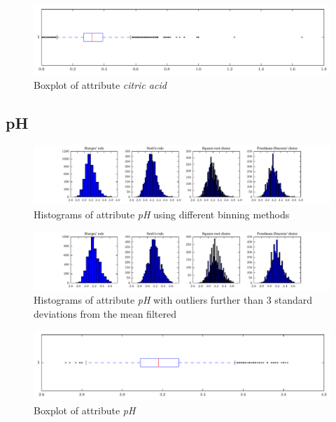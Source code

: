 \documentclass{report}
\begin{document}
\begin{figure}[H]
\includegraphics[width=\textwidth]{boxplots/citric_acid.pdf}
\caption{Boxplot of attribute \emph{citric acid}}\end{figure}

\newpage\subsection{pH}
\begin{figure}[H]
\includegraphics[width=\textwidth]{histograms/pH.pdf}
\caption{Histograms of attribute \emph{pH} using different binning methods}\end{figure}

\begin{figure}[H]
\includegraphics[width=\textwidth]{histograms/pH_filtered.pdf}
\caption{Histograms of attribute \emph{pH} with outliers further than 3 standard deviations from the mean filtered}
\end{figure}

\begin{figure}[H]
\includegraphics[width=\textwidth]{boxplots/pH.pdf}
\caption{Boxplot of attribute \emph{pH}}\end{figure}
\end{document}
